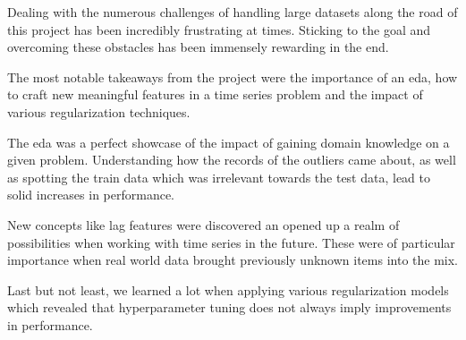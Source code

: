 Dealing with the numerous challenges of handling large datasets along the road of this project has been incredibly frustrating at times. Sticking to the goal and overcoming these obstacles has been immensely rewarding in the end.

The most notable takeaways from the project were the importance of an \acrshort{eda}, how to craft new meaningful features in a time series problem and the impact of various regularization techniques.

The \acrshort{eda} was a perfect showcase of the impact of gaining domain knowledge on a given problem. Understanding how the records of the outliers came about, as well as spotting the train data which was irrelevant towards the test data, lead to solid increases in performance.

New concepts like lag features were discovered an opened up a realm of possibilities when working with time series in the future. These were of particular importance when real world data brought previously unknown items into the mix.

Last but not least, we learned a lot when applying various regularization models which revealed that hyperparameter tuning does not always imply improvements in performance.
